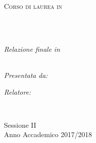 \documentclass[
12pt,
singlespacing,
headsepline,
]{BachelorThesis} %
\author{Simone \textsc{Magnani}}
\begin{document}
\frontmatter %

\nocite{*}

\pagestyle{plain} %


\begin{titlepage}
\begin{center}

\vspace*{.06\textheight}
{\scshape\large \univname\par\deptname\par\facname\par}\vspace{1.5cm} %
\textsc{\large Corso di laurea in \degreename}\\[0.5cm] %

\HRule \\[0.4cm] %
{\huge \bfseries \ttitle\par}\vspace{0.4cm} %
\HRule \\[1.5cm] %
 
\vfill

\large \textit{Relazione finale in}\\[0.3cm] %
\groupname\\[2cm] %

\begin{minipage}[t]{0.4\textwidth}
\begin{flushleft} \large
\emph{Presentata da:}\\
\href{https://www.linkedin.com/in/simone-magnani-564830151/}{\authorname} %

\end{flushleft}
\end{minipage}
\begin{minipage}[t]{0.4\textwidth}
\begin{flushright} \large
\emph{Relatore:} \\
\href{http://www.cs.unibo.it/~gdangelo/}{\supname} %
\end{flushright}
\end{minipage}\\[3cm]
 
\vfill

{\large Sessione II}\\ %
{\large Anno Accademico 2017/2018}\\[4cm] %
 
\vfill
\end{center}
\end{titlepage}
\end{document}
